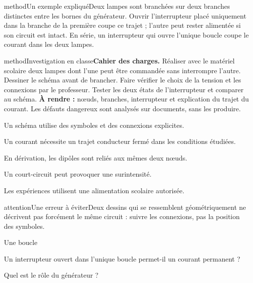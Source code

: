 \begin{pcEncadre}{method}{Un exemple expliqué}Deux lampes sont branchées sur deux branches distinctes entre les bornes du générateur. Ouvrir l’interrupteur placé uniquement dans la branche de la première coupe ce trajet ; l’autre peut rester alimentée si son circuit est intact. En série, un interrupteur qui ouvre l’unique boucle coupe le courant dans les deux lampes.\end{pcEncadre}
\label{activite-13}
\begin{pcEncadre}{method}{Investigation en classe}\textbf{Cahier des charges.} Réaliser avec le matériel scolaire deux lampes dont l’une peut être commandée sans interrompre l’autre. Dessiner le schéma avant de brancher. Faire vérifier le choix de la tension et les connexions par le professeur. Tester les deux états de l’interrupteur et comparer au schéma. \textbf{À rendre :} nœuds, branches, interrupteur et explication du trajet du courant. Les défauts dangereux sont analysés sur documents, sans les produire.\end{pcEncadre}
\begin{questions}
\item Un schéma utilise des symboles et des connexions explicites.
\item Un courant nécessite un trajet conducteur fermé dans les conditions étudiées.
\item En dérivation, les dipôles sont reliés aux mêmes deux nœuds.
\item Un court-circuit peut provoquer une surintensité.
\item Les expériences utilisent une alimentation scolaire autorisée.
\end{questions}
\begin{pcEncadre}{attention}{Une erreur à éviter}Deux dessins qui se ressemblent géométriquement ne décrivent pas forcément le même circuit : suivre les connexions, pas la position des symboles.\end{pcEncadre}
\pcGrille
\clearpage{}
\par\noindent\begin{minipage}{\linewidth}
\begin{exercice}[1]{Une boucle}
\begin{questions}
\item Un interrupteur ouvert dans l’unique boucle permet-il un courant permanent ?
\item Quel est le rôle du générateur ?
\end{questions}
\end{exercice}
\end{minipage}
